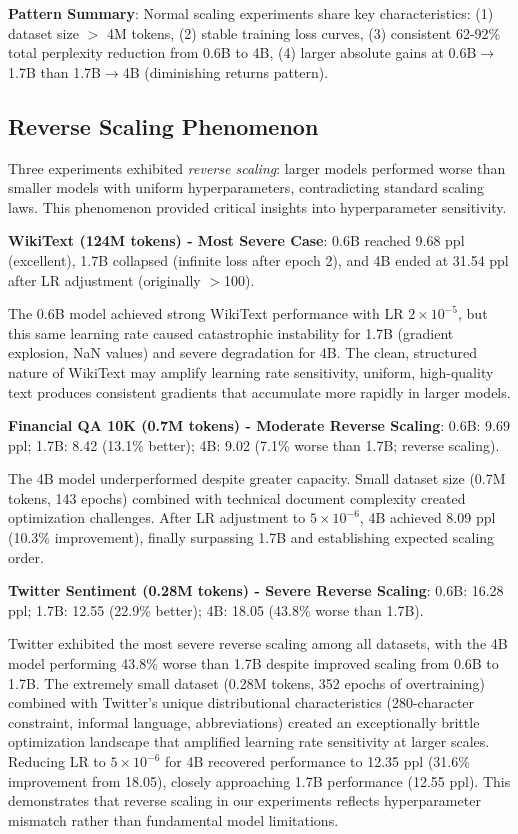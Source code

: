 \textbf{Pattern Summary}: Normal scaling experiments share key characteristics: (1) dataset size $>$ 4M tokens, (2) stable training loss curves, (3) consistent 62-92\% total perplexity reduction from 0.6B to 4B, (4) larger absolute gains at 0.6B$\to$1.7B than 1.7B$\to$4B (diminishing returns pattern).

\subsection{Reverse Scaling Phenomenon}

Three experiments exhibited \textit{reverse scaling}: larger models performed worse than smaller models with uniform hyperparameters, contradicting standard scaling laws. This phenomenon provided critical insights into hyperparameter sensitivity.

\textbf{WikiText (124M tokens) - Most Severe Case}: 0.6B reached 9.68 ppl (excellent), 1.7B collapsed (infinite loss after epoch 2), and 4B ended at 31.54 ppl after LR adjustment (originally $>$100).

The 0.6B model achieved strong WikiText performance with LR $2\times10^{-5}$, but this same learning rate caused catastrophic instability for 1.7B (gradient explosion, NaN values) and severe degradation for 4B. The clean, structured nature of WikiText may amplify learning rate sensitivity, uniform, high-quality text produces consistent gradients that accumulate more rapidly in larger models.

\textbf{Financial QA 10K (0.7M tokens) - Moderate Reverse Scaling}: 0.6B: 9.69 ppl; 1.7B: 8.42 (13.1\% better); 4B: 9.02 (7.1\% worse than 1.7B; reverse scaling).

The 4B model underperformed despite greater capacity. Small dataset size (0.7M tokens, 143 epochs) combined with technical document complexity created optimization challenges. After LR adjustment to $5\times10^{-6}$, 4B achieved 8.09 ppl (10.3\% improvement), finally surpassing 1.7B and establishing expected scaling order.

\textbf{Twitter Sentiment (0.28M tokens) - Severe Reverse Scaling}: 0.6B: 16.28 ppl; 1.7B: 12.55 (22.9\% better); 4B: 18.05 (43.8\% worse than 1.7B).

Twitter exhibited the most severe reverse scaling among all datasets, with the 4B model performing 43.8\% worse than 1.7B despite improved scaling from 0.6B to 1.7B. The extremely small dataset (0.28M tokens, 352 epochs of overtraining) combined with Twitter's unique distributional characteristics (280-character constraint, informal language, abbreviations) created an exceptionally brittle optimization landscape that amplified learning rate sensitivity at larger scales. Reducing LR to $5\times10^{-6}$ for 4B recovered performance to 12.35 ppl (31.6\% improvement from 18.05), closely approaching 1.7B performance (12.55 ppl). This demonstrates that reverse scaling in our experiments reflects hyperparameter mismatch rather than fundamental model limitations.

